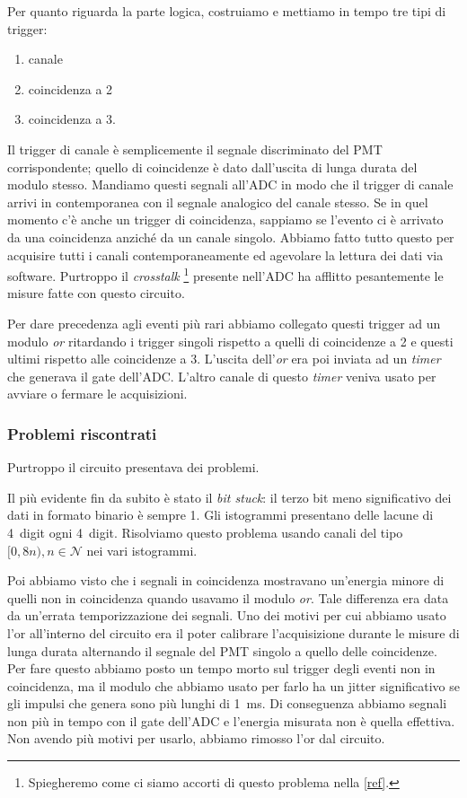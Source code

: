 Per quanto riguarda la parte logica, costruiamo e mettiamo in tempo tre tipi di trigger:
\begin{enumerate}
\item canale
\item coincidenza a 2
\item coincidenza a 3.
\end{enumerate}
Il trigger di canale è semplicemente il segnale discriminato del PMT corrispondente; quello di coincidenze è dato dall'uscita di lunga durata del modulo stesso. Mandiamo questi segnali all'ADC in modo che il trigger di canale arrivi in contemporanea con il segnale analogico del canale stesso. Se in quel momento c'è anche un trigger di coincidenza, sappiamo se l'evento ci è arrivato da una coincidenza anziché da un canale singolo. Abbiamo fatto tutto questo per acquisire tutti i canali contemporaneamente ed agevolare la lettura dei dati via software. Purtroppo il \emph{crosstalk}%
\footnote{Spiegheremo come ci siamo accorti di questo problema nella \autoref{ref}.} presente nell'ADC ha afflitto pesantemente le misure fatte con questo circuito.

Per dare precedenza agli eventi più rari abbiamo collegato questi trigger ad un modulo \emph{or} ritardando i trigger singoli rispetto a quelli di coincidenze a 2 e questi ultimi rispetto alle coincidenze a 3. L'uscita dell'\emph{or} era poi inviata ad un \emph{timer} che generava il gate dell'ADC. L'altro canale di questo \emph{timer} veniva usato per avviare o fermare le acquisizioni.

\subsubsection{Problemi riscontrati}

Purtroppo il circuito presentava dei problemi.

Il più evidente fin da subito è stato il \emph{bit stuck}: il terzo bit meno significativo dei dati in formato binario è sempre 1.
Gli istogrammi presentano delle lacune di \SI{4}{digit} ogni \SI{4}{digit}. Risolviamo questo problema usando canali del tipo $[0,8n) , n \in \mathcal{N}$ nei vari istogrammi.

Poi abbiamo visto che i segnali in coincidenza mostravano un'energia minore di quelli non in coincidenza quando usavamo il modulo \emph{or}.
Tale differenza era data da un'errata temporizzazione dei segnali.
Uno dei motivi per cui abbiamo usato l'or all'interno del circuito era il poter calibrare l'acquisizione durante le misure di lunga durata alternando il segnale del PMT singolo a quello delle coincidenze.
Per fare questo abbiamo posto un tempo morto sul trigger degli eventi non in coincidenza, ma il modulo che abbiamo usato per farlo ha un jitter significativo se gli impulsi che genera sono più lunghi di \SI{1}{ms}. Di conseguenza abbiamo segnali non più in tempo con il gate dell'ADC e l'energia misurata non è quella effettiva.
Non avendo più motivi per usarlo, abbiamo rimosso l'or dal circuito.

